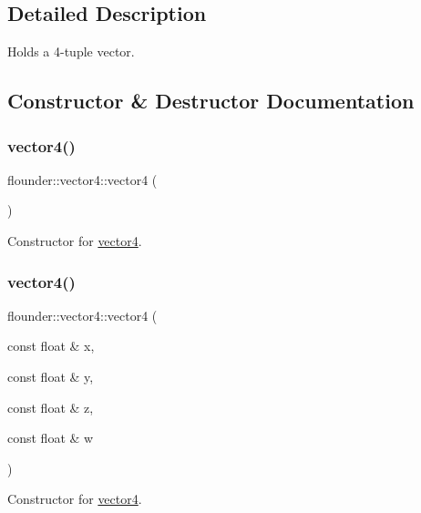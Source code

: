 \subsection{Detailed Description}
Holds a 4-\/tuple vector. 



\subsection{Constructor \& Destructor Documentation}
\mbox{\label{classflounder_1_1vector4_ab2f9a25788fea44dcf9c748af1302897}} 
\subsubsection{\texorpdfstring{vector4()}{vector4()}\hspace{0.1cm}{\footnotesize\ttfamily [1/3]}}
{\footnotesize\ttfamily flounder\+::vector4\+::vector4 (\begin{DoxyParamCaption}{ }\end{DoxyParamCaption})}



Constructor for \hyperlink{classflounder_1_1vector4}{vector4}. 

\mbox{\label{classflounder_1_1vector4_aa319f876f373f25cd5ffa25dc92566c8}} 
\subsubsection{\texorpdfstring{vector4()}{vector4()}\hspace{0.1cm}{\footnotesize\ttfamily [2/3]}}
{\footnotesize\ttfamily flounder\+::vector4\+::vector4 (\begin{DoxyParamCaption}\item[{const float \&}]{x,  }\item[{const float \&}]{y,  }\item[{const float \&}]{z,  }\item[{const float \&}]{w }\end{DoxyParamCaption})}



Constructor for \hyperlink{classflounder_1_1vector4}{vector4}. 



